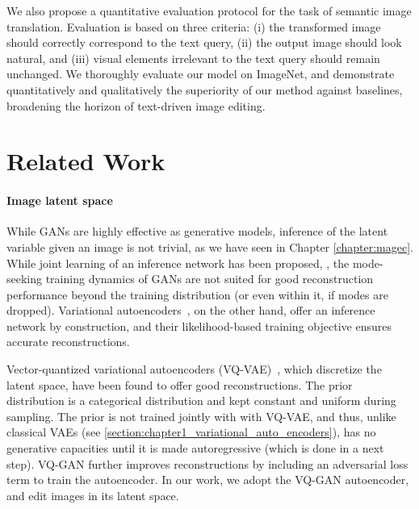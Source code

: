 We also propose a quantitative evaluation protocol for the task of semantic image 
translation. 
Evaluation is based on three criteria: (i) the transformed image should correctly 
correspond to the text query, (ii) the output image should look natural,  and (iii) 
visual elements irrelevant to the text query should remain unchanged. 
We thoroughly evaluate our model on ImageNet, and  demonstrate quantitatively and 
qualitatively the superiority of our method against baselines, broadening the horizon 
of text-driven image editing.


\section{Related Work}




\paragraph{Image latent space}
While GANs are highly effective as generative models, inference of the latent variable 
given an image is not trivial, as we have seen in Chapter \ref{chapter:magec}. 
While joint learning of an inference network has been proposed, \citep{donahue17iclr,dumoulin17iclr}, 
the mode-seeking training dynamics of GANs are 
 not suited for good reconstruction performance beyond the training distribution 
 (or even within it, if modes are dropped).
Variational autoencoders~\cite{Kingma2014}, on the other hand, offer an inference 
network by construction, and their likelihood-based training objective ensures accurate 
reconstructions.

Vector-quantized  variational autoencoders (VQ-VAE)~\cite{oord17nips,razavi2019generating},
 which discretize the latent space, have been found to offer good reconstructions. The prior distribution
 is a categorical distribution and kept constant and uniform during sampling.
 The prior is not trained jointly with with VQ-VAE, and thus, unlike classical \ac{VAE}s (see \ref{section:chapter1_variational_auto_encoders}),
 has no generative capacities until it is made autoregressive (which is done in a next step). 
VQ-GAN \citep{esser2021taming,yu2021vector} further improves reconstructions 
by  including an adversarial loss term to train the autoencoder.
In our work,  we adopt the VQ-GAN autoencoder,  and edit  images in its latent space.



